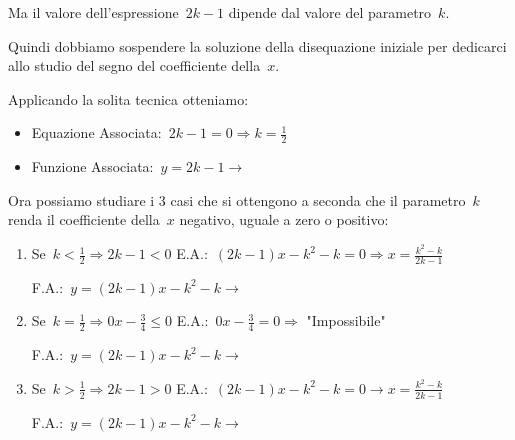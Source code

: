 Ma il valore dell'espressione~$2 k - 1$ dipende dal valore del 
parametro~$k$. 

Quindi dobbiamo sospendere la soluzione della disequazione iniziale per 
dedicarci allo studio del segno del coefficiente della~$x$. 

Applicando la solita tecnica otteniamo:

\begin{itemize} [noitemsep]
 \item
  Equazione Associata:~$2 k -1=0 \Rightarrow k=\frac{1}{2}$
 \item 
  \begin{minipage}{.40\textwidth}
  Funzione Associata:~$y=2 k -1 \rightarrow$
  \end{minipage}
  \begin{minipage}{.30\textwidth}
  
  \end{minipage}
\end{itemize}

Ora possiamo studiare i 3 casi che si ottengono a seconda che il 
parametro~$k$ renda il coefficiente della~$x$ negativo, uguale a zero 
o positivo:

\begin{enumerate}
 \item Se~$k < \frac{1}{2} \Rightarrow 2 k - 1 < 0$
 \subitem E.A.:~$(2 k - 1) x - k^2 - k = 0 \Rightarrow x=\frac{k^2 - k}{2 k - 
1}$
 \subitem
  \begin{minipage}{.4\textwidth}
   F.A.:~$y=(2 k - 1) x - k^2 - k \rightarrow$
  \end{minipage}
  \begin{minipage}{.30\textwidth}
  
  \end{minipage}
 \item Se~$k = \frac{1}{2} \Rightarrow 0 x - \frac{3}{4} \le 0$
  \subitem E.A.:~$0 x - \frac{3}{4} = 0 \Rightarrow$ "Impossibile"
  \subitem
  \begin{minipage}{.4\textwidth}
   F.A.:~$y=(2 k - 1) x - k^2 - k \rightarrow$
  \end{minipage}
  \begin{minipage}{.30\textwidth}
  
  \end{minipage}
 \item Se~$k > \frac{1}{2} \Rightarrow 2 k - 1 > 0$
  \subitem E.A.:~$(2 k - 1 ) x - k^2 - k = 0 \rightarrow x=\frac{k^2 - k}{2 k - 
1}$
  \subitem
  \begin{minipage}{.4\textwidth}
   F.A.:~$y=(2 k - 1 ) x - k^2 - k \rightarrow$
  \end{minipage}
  \begin{minipage}{.30\textwidth}
  
  \end{minipage}
\end{enumerate}

